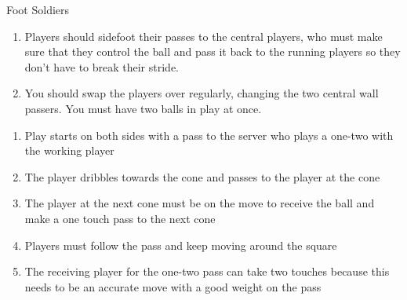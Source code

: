 \begin{evenBlock}{Foot Soldiers}
\begin{minipage}[t]{\linewidth}
\begin{minipage}{.5\linewidth}
\begin{enumerate}
        \item Players should sidefoot their passes to the central players, who must make sure that they control the ball and pass it back to the running players so they don’t have to break their stride.
        \item You should swap the players over regularly, changing the two central wall passers. You must have two balls in play at once.
        \end{enumerate}

        \begin{enumerate}
        \setlength{\itemsep}{0pt}
        \setlength{\parskip}{0pt}
        \setlength{\parsep}{0pt}
        \item Play starts on both sides with a pass to the server who plays a one-two with the working player
        \item The player dribbles towards the cone and passes to the player at the cone
        \item The player at the next cone must be on the move to receive the ball and make a one touch pass to the next cone
        \item Players must follow the pass and keep moving around the square
        \item The receiving player for the one-two pass can take two touches because this needs to be an accurate move with a good weight on the pass
        \end{enumerate}

    \end{minipage}
\end{minipage}

\end{evenBlock}